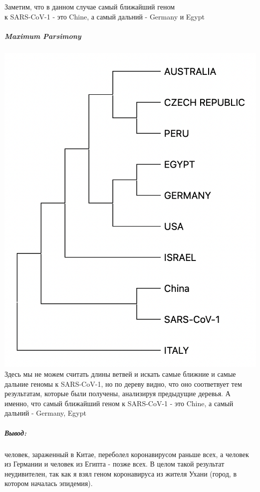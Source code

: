 \documentclass[12pt]{article}
\begin{document}
Заметим, что в данном случае самый ближайший геном\\к SARS-CoV-1 - это Chine, а самый дальний - Germany и Egypt

\subparagraph{Maximum Parsimony\\}
\includegraphics[scale=0.6]{images/MP.png}\\

Здесь мы не можем считать длины ветвей и искать самые ближние и самые дальние геномы к SARS-CoV-1, но по дереву видно, что оно соответвует тем результатам, которые были получены, анализируя предыдущие деревья. А именно, что самый ближайший геном к SARS-CoV-1 - это Chine, а самый дальний - Germany, Egypt \\


\subparagraph{Вывод:} человек, зараженный в Китае, переболел коронавирусом раньше всех, а человек из Германии и человек из Египта - позже всех. В целом такой результат неудивителен, так как я взял геном коронавируса из жителя Ухани (город, в котором началась эпидемия).

\newpage
\end{document}
